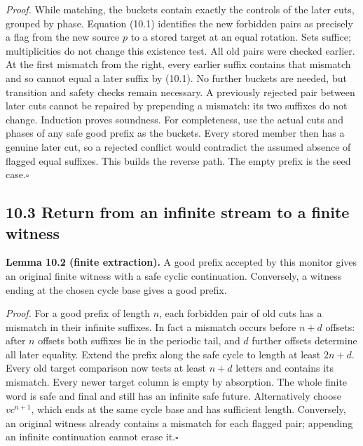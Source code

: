 \documentclass[
  11pt,
  a4paper,
]{article}
\begin{document}
\emph{Proof.} While matching, the buckets contain exactly the controls
of the later cuts, grouped by phase. Equation (10.1) identifies the new
forbidden pairs as precisely a flag from the new source \(p\) to a
stored target at an equal rotation. Sets suffice; multiplicities do not
change this existence test. All old pairs were checked earlier. At the
first mismatch from the right, every earlier suffix contains that
mismatch and so cannot equal a later suffix by (10.1). No further
buckets are needed, but transition and safety checks remain necessary. A
previously rejected pair between later cuts cannot be repaired by
prepending a mismatch: its two suffixes do not change. Induction proves
soundness. For completeness, use the actual cuts and phases of any safe
good prefix as the buckets. Every stored member then has a genuine later
cut, so a rejected conflict would contradict the assumed absence of
flagged equal suffixes. This builds the reverse path. The empty prefix
is the seed case.\nobreak\hspace{.5em}\(\square\)

\subsection{10.3 Return from an infinite stream to a finite
witness}\label{return-from-an-infinite-stream-to-a-finite-witness}


\textbf{Lemma 10.2 (finite extraction).} A good prefix accepted by this
monitor gives an original finite witness with a safe cyclic
continuation. Conversely, a witness ending at the chosen cycle base
gives a good prefix.

\emph{Proof.} For a good prefix of length \(n\), each forbidden pair of
old cuts has a mismatch in their infinite suffixes. In fact a mismatch
occurs before \(n+d\) offsets: after \(n\) offsets both suffixes lie in
the periodic tail, and \(d\) further offsets determine all later
equality. Extend the prefix along the safe cycle to length at least
\(2n+d\). Every old target comparison now tests at least \(n+d\) letters
and contains its mismatch. Every newer target column is empty by
absorption. The whole finite word is safe and final and still has an
infinite safe future. Alternatively choose \(v c^{n+1}\), which ends at
the same cycle base and has sufficient length. Conversely, an original
witness already contains a mismatch for each flagged pair; appending an
infinite continuation cannot erase it.\nobreak\hspace{.5em}\(\square\)
\end{document}
